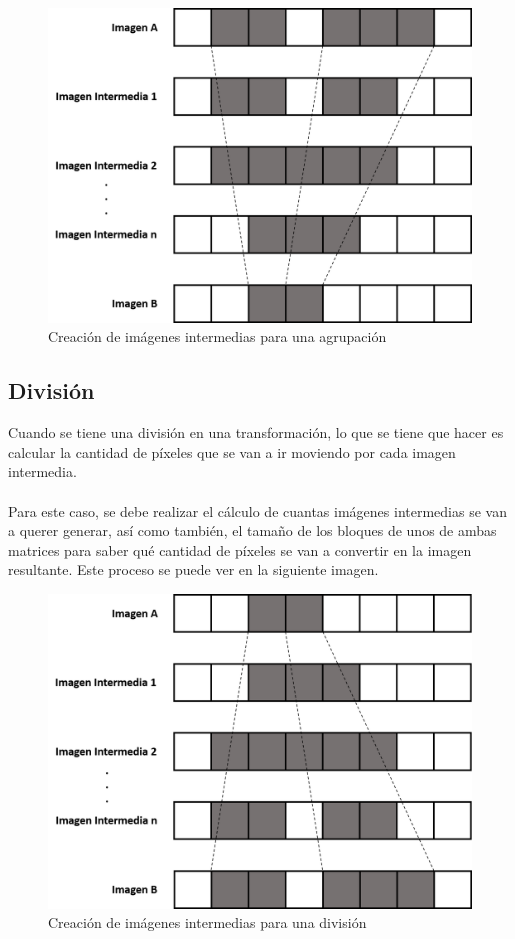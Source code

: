 \documentclass[conference]{IEEEtran}
\begin{document}
\begin{figure}[H]
  \centering
  \includegraphics[scale=0.35]{images/agrupacion.png}
  \caption[agrupacion]{Creación de imágenes intermedias para una agrupación}
  \label{fig:agrupacion}
\end{figure}

\subsection{División}
Cuando se tiene una división en una transformación, lo que se tiene que hacer es calcular la cantidad de píxeles que se van a ir moviendo por cada imagen intermedia.
\verb||\\\\
Para este caso, se debe realizar el cálculo de cuantas imágenes intermedias se van a querer generar, así como también, el tamaño de los bloques de unos de ambas matrices para saber qué cantidad de píxeles se van a convertir en la imagen resultante. Este proceso se puede ver en la siguiente imagen.

\begin{figure}[H]
  \centering
  \includegraphics[scale=0.35]{images/division.png}
  \caption[division]{Creación de imágenes intermedias para una división}
  \label{fig:division}
\end{figure}
\end{document}
